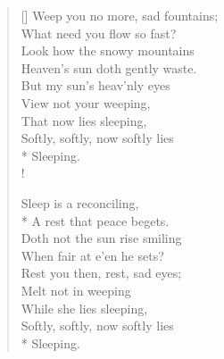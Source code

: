 \documentclass[MAIN]{subfiles}
\begin{document}
\settowidth{\versewidth}{Intreat me not to leave thee,}
\begin{verse}[\versewidth]
Weep you no more, sad fountains;\\
\vin What need you flow so fast?\\
Look how the snowy mountains\\
\vin Heaven's sun doth gently waste.\\
\vin But my sun's heav'nly eyes\\
\vin \vin View not your weeping,\\
\vin \vin That now lies sleeping,\\
\vin Softly, softly, now softly lies\\*
\vin \vin \vin Sleeping.\\!

Sleep is a reconciling,\\*
\vin A rest that peace begets.\\
Doth not the sun rise smiling\\
\vin When fair at e'en he sets?\\
\vin Rest you then, rest, sad eyes;\\
\vin \vin Melt not in weeping\\
\vin \vin While she lies sleeping,\\
\vin Softly, softly, now softly lies\\*
\vin \vin \vin Sleeping.
\end{verse}
\end{document}
